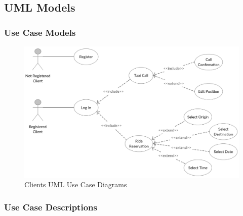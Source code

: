 \documentclass[a4paper]{article}
\begin{document}
\begin{enumerate}[label=\bfseries G\arabic*:]
\subsection{UML Models}


\subsubsection{Use Case Models}

\begin{figure}[H]
\includegraphics[width=\textwidth]{UseCase-Client}
\centering
\caption{Clients UML Use Case Diagrams}
\label{fig:usecaseclient}
\end{figure}

\subsubsection{Use Case Descriptions}

\renewcommand{\arraystretch}{1.25}


\end{enumerate}
\end{document}
